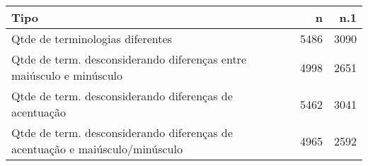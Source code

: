 \begin{table}[ht]
\centering
\begin{tabular}{lrr}
  \hline
Tipo & n & n.1 \\ 
  \hline
Qtde de terminologias diferentes & 5486 & 3090 \\ 
  Qtde de term. desconsiderando diferenças entre maiúsculo e minúsculo & 4998 & 2651 \\ 
  Qtde de term. desconsiderando diferenças de acentuação & 5462 & 3041 \\ 
  Qtde de term. desconsiderando diferenças de acentuação e
          maiúsculo/minúsculo & 4965 & 2592 \\ 
   \hline
\end{tabular}
\end{table}
